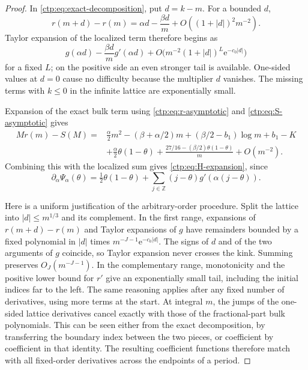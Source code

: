 \documentclass[11pt,a4paper]{article}
\numberwithin{equation}{section}
\theoremstyle{definition}
\theoremstyle{remark}
\newcommand{\Z}{\mathbb Z}
\newcommand{\e}{\mathrm e}
\begin{document}
\begin{proof}
In \eqref{ctp:eq:exact-decomposition}, put $d=k-m$. For a bounded $d$,
\[
 r(m+d)-r(m)=\alpha d-\frac{\beta d}{m}+O((1+|d|)^2m^{-2}).
\]
Taylor expansion of the localized term therefore begins as
\[
 g(\alpha d)-\frac{\beta d}{m}g'(\alpha d)+O\bigl(m^{-2}
 (1+|d|)^L\e^{-c_0|d|}\bigr)
\]
for a fixed $L$; on the positive side an even stronger tail is available.
One-sided values at $d=0$ cause no difficulty because the multiplier $d$
vanishes. The missing terms with $k\leq0$ in the infinite lattice are
exponentially small.

Expansion of the exact bulk term using \eqref{ctp:eq:r-asymptotic} and
\eqref{ctp:eq:S-asymptotic} gives
\begin{align*}
 Mr(m)-S(M)={}&\frac\alpha2m^2-(\beta+\alpha/2)m+
 (\beta/2-b_1)\log m+b_1-K\\
 &+\frac\alpha2\theta(1-\theta)
 +\frac{27/16-(\beta/2)\theta(1-\theta)}m+O(m^{-2}).
\end{align*}
Combining this with the localized sum gives \eqref{ctp:eq:H-expansion}, since
\[
 \partial_\alpha\Psi_\alpha(\theta)
 =\tfrac12\theta(1-\theta)
  +\sum_{j\in\Z}(j-\theta)g'(\alpha(j-\theta)).
\]

Here is a uniform justification of the arbitrary-order procedure.
Split the lattice into $|d|\leq m^{1/3}$ and its complement.
In the first range, expansions of $r(m+d)-r(m)$ and Taylor expansions of
$g$ have remainders bounded by a fixed polynomial in $|d|$ times
$m^{-J-1}\e^{-c_0|d|}$. The signs of $d$ and of the two arguments of $g$
coincide, so Taylor expansion never crosses the kink. Summing preserves
$O_J(m^{-J-1})$. In the complementary range, monotonicity and the positive
lower bound for $r'$ give an exponentially small tail, including the
initial indices far to the left. The same reasoning applies after any
fixed number of derivatives, using more terms at the start.
At integral $m$, the jumps of the one-sided lattice derivatives cancel
exactly with those of the fractional-part bulk polynomials. This can be
seen either from the exact decomposition, by transferring the boundary
index between the two pieces, or coefficient by coefficient in that
identity. The resulting coefficient functions therefore match with all
fixed-order derivatives across the endpoints of a period.
\end{proof}
\end{document}
